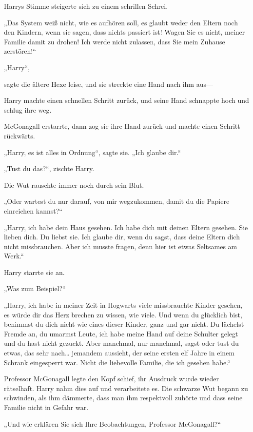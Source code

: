 {Harrys Stimme steigerte sich zu einem schrillen Schrei.

„Das System weiß nicht, wie es aufhören soll, es glaubt weder den Eltern noch den Kindern, wenn sie sagen, dass nichts passiert ist! Wagen Sie es nicht, meiner Familie damit zu drohen! Ich werde nicht zulassen, dass Sie mein Zuhause zerstören!“

„Harry“,

sagte die ältere Hexe leise, und sie streckte eine Hand nach ihm aus—

Harry machte einen schnellen Schritt zurück, und seine Hand schnappte hoch und schlug ihre weg.

McGonagall erstarrte, dann zog sie ihre Hand zurück und machte einen Schritt rückwärts.

„Harry, es ist alles in Ordnung“, sagte sie. „Ich glaube dir.“

„Tust du das?“, zischte Harry.

Die Wut rauschte immer noch durch sein Blut.

„Oder wartest du nur darauf, von mir wegzukommen, damit du die Papiere einreichen kannst?“

„Harry, ich habe dein Haus gesehen. Ich habe dich mit deinen Eltern gesehen. Sie lieben dich. Du liebst sie. Ich glaube dir, wenn du sagst, dass deine Eltern dich nicht missbrauchen. Aber ich musste fragen, denn hier ist etwas Seltsames am Werk.“

Harry starrte sie an.

„Was zum Beispiel?“

„Harry, ich habe in meiner Zeit in Hogwarts viele missbrauchte Kinder gesehen, es würde dir das Herz brechen zu wissen, wie viele. Und wenn du glücklich bist, benimmst du dich nicht wie eines dieser Kinder, ganz und gar nicht. Du lächelst Fremde an, du umarmst Leute, ich habe meine Hand auf deine Schulter gelegt und du hast nicht gezuckt. Aber manchmal, nur manchmal, sagst oder tust du etwas, das sehr nach… jemandem aussieht, der seine ersten elf Jahre in einem Schrank eingesperrt war. Nicht die liebevolle Familie, die ich gesehen habe.“

Professor McGonagall legte den Kopf schief, ihr Ausdruck wurde wieder rätselhaft. Harry nahm dies auf und verarbeitete es. Die schwarze Wut begann zu schwinden, als ihm dämmerte, dass man ihm respektvoll zuhörte und dass seine Familie nicht in Gefahr war.

„Und wie erklären Sie sich Ihre Beobachtungen, Professor McGonagall?“

}
